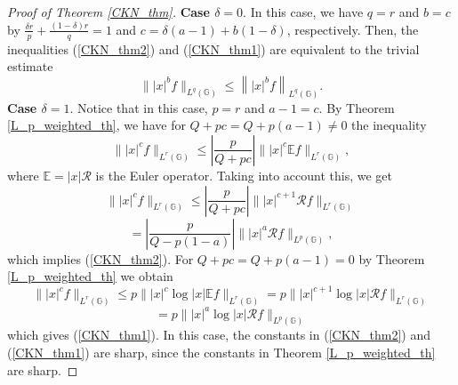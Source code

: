 \documentclass[a4paper,12pt,reqno]{amsart}
\renewcommand\eqref[1]{(\ref{#1})} %
\numberwithin{equation}{section}
\theoremstyle{plain}
\theoremstyle{definition}
\begin{document}
\begin{proof}[Proof of Theorem \ref{CKN_thm}] {\bf Case $\delta=0$}. In this case, we have $q=r$ and $b=c$ by $\frac{\delta r}{p}+\frac{(1-\delta)r}{q}=1$ and $c=\delta(a-1)+b(1-\delta)$, respectively. Then, the inequalities \eqref{CKN_thm2} and \eqref{CKN_thm1} are equivalent to the trivial estimate
$$
\||x|^{b}f\|_{L^{q}(\mathbb{G})}
\leq \left\||x|^{b}f\right\|_{L^{q}(\mathbb{G})}.
$$
{\bf Case $\delta=1$}. Notice that in this case, $p=r$ and $a-1=c$. By Theorem \ref{L_p_weighted_th}, we have for $Q+pc=Q+p(a-1)\neq0$ the inequality
$$\||x|^{c}f\|_{L^{r}(\mathbb{G})}\leq \left|\frac{p}{Q+pc}\right|\||x|^{c}\mathbb{E}f\|_{L^{r}(\mathbb{G})},$$
where $\mathbb{E}=|x|\mathcal{R}$ is the Euler operator. Taking into account this, we get
$$\||x|^{c}f\|_{L^{r}(\mathbb{G})}\leq \left|\frac{p}{Q+pc}\right|\||x|^{c+1}\mathcal{R}f\|_{L^{r}(\mathbb{G})}$$
$$=\left|\frac{p}{Q-p(1-a)}\right|\||x|^{a}\mathcal{R}f\|_{L^{p}(\mathbb{G})},$$
which implies \eqref{CKN_thm2}.
For $Q+pc=Q+p(a-1)=0$ by Theorem \ref{L_p_weighted_th} we obtain
$$\||x|^{c}f\|_{L^{r}(\mathbb{G})}\leq p\||x|^{c}\log|x|\mathbb{E}f\|_{L^{r}(\mathbb{G})}=p\||x|^{c+1}\log|x|\mathcal{R}f\|_{L^{r}(\mathbb{G})}$$
$$=p\||x|^{a}\log|x|\mathcal{R}f\|_{L^{p}(\mathbb{G})}$$
which gives \eqref{CKN_thm1}. In this case, the constants in \eqref{CKN_thm2} and \eqref{CKN_thm1} are sharp, since the constants in Theorem \ref{L_p_weighted_th} are sharp.


\end{proof}
\end{document}
